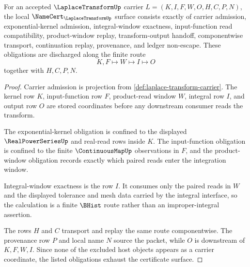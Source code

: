\begin{theorem}
\label{thm:laplace-transform-namecert-obligations}
For an accepted $\LaplaceTransformUp$ carrier $L=(K,I,F,W,O,H,C,P,N)$, the local $\NameCert_{\LaplaceTransformUp}$ surface consists exactly of carrier admission, exponential-kernel admission, integral-window exactness, input-function read compatibility, product-window replay, transform-output handoff, componentwise transport, continuation replay, provenance, and ledger non-escape. These obligations are discharged along the finite route
$$
K,F\longmapsto W\longmapsto I\longmapsto O
$$
together with $H,C,P,N$.
\end{theorem}
\begin{proof}
Carrier admission is projection from \autoref{def:laplace-transform-carrier}. The kernel row $K$, input-function row $F$, product-read window $W$, integral row $I$, and output row $O$ are stored coordinates before any downstream consumer reads the transform.

The exponential-kernel obligation is confined to the displayed $\RealPowerSeriesUp$ and real-read rows inside $K$. The input-function obligation is confined to the finite $\ContinuousMapUp$ observations in $F$, and the product-window obligation records exactly which paired reads enter the integration window.

Integral-window exactness is the row $I$. It consumes only the paired reads in $W$ and the displayed tolerance and mesh data carried by the integral interface, so the calculation is a finite $\BHist$ route rather than an improper-integral assertion.

The rows $H$ and $C$ transport and replay the same route componentwise. The provenance row $P$ and local name $N$ source the packet, while $O$ is downstream of $K,F,W,I$. Since none of the excluded host objects appears as a carrier coordinate, the listed obligations exhaust the certificate surface.
\end{proof}

